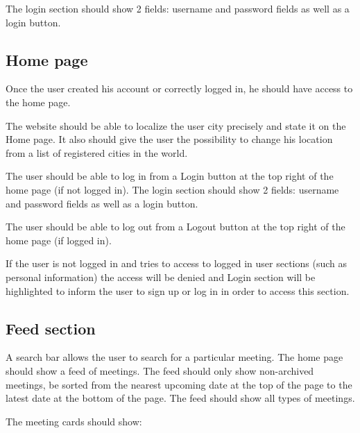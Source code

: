 \documentclass[conference]{IEEEtran}
\begin{document}
The login section should show 2 fields: username and password fields as well as a login button.

\subsection{Home page}

Once the user created his account or correctly logged in, he should have access to the home page.

The website should be able to localize the user city precisely and state it on the Home page. It also should give the user the possibility to change his location from a list of registered cities in the world.

The user should be able to log in from a Login button at the top right of the home page (if not logged in). The login section should show 2 fields: username and password fields as well as a login button.

The user should be able to log out from a Logout button at the top right of the home page (if logged in).

If the user is not logged in and tries to access to logged in user sections (such as personal information) the access will be denied and Login section will be highlighted to inform the user to sign up or log in in order to access this section.


\subsection{Feed section}

A search bar allows the user to search for a particular meeting.
The home page should show a feed of meetings. The feed should only show non-archived meetings, be sorted from the nearest upcoming date at the top of the page to the latest date at the bottom of the page. The feed should show all types of meetings.

The meeting cards should show:
\end{document}
